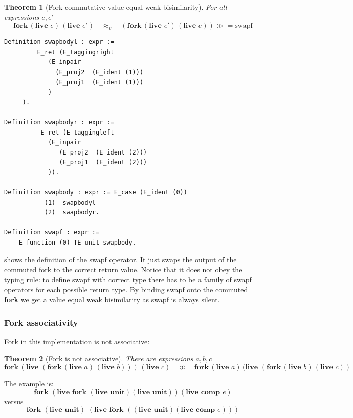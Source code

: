 \documentclass[12pt,twoside,notitlepage]{report}
\theoremstyle{plain}%
\newtheorem{thm}{Theorem}[section]
\theoremstyle{definition}
\theoremstyle{remark}
\begin{document}
\begin{thm}[Fork commutative value equal weak bisimilarity]
For all expressions $ e, e'$
\[  \textbf{fork}\,(\textbf{live }e)\,(\textbf{live }e')\quad \approx_v \quad (\textbf{fork}\,(\textbf{live }e')\,(\textbf{live }e))\gg=\text{swapf} \]
\end{thm}

\begin{lstlisting}[language={Coq}, caption={Swapf operator}, label={lst:swapf_op}]
Definition swapbodyl : expr :=
         E_ret (E_taggingright
            (E_inpair 
              (E_proj2  (E_ident (1))) 
              (E_proj1  (E_ident (1)))  
            )
     ).

Definition swapbodyr : expr :=
          E_ret (E_taggingleft  
            (E_inpair 
               (E_proj2  (E_ident (2))) 
               (E_proj1  (E_ident (2)))  
            )).

Definition swapbody : expr := E_case (E_ident (0)) 
           (1)  swapbodyl
           (2)  swapbodyr.

Definition swapf : expr :=
    E_function (0) TE_unit swapbody.
\end{lstlisting}
 shows the definition of the swapf operator. It just swaps the output of the commuted fork to the correct return value. Notice that it does not obey the typing rule: to define swapf with correct type there has to be a family of swapf operators for each possible return type. By binding swapf onto the commuted \textbf{fork} we get a value equal weak bisimilarity as swapf is always silent.

\subsubsection{Fork associativity}
Fork in this implementation is not associative:

\begin{thm}[Fork is not associative]
There are expressions $a, b, c$
\[  \textbf{fork}\,(\textbf{live }(\textbf{fork}\,(\textbf{live }a)\,(\textbf{live }b)))\,(\textbf{live }c)\quad \not\approx \quad \textbf{fork}\,(\textbf{live }a)\,(\textbf{live }(\textbf{fork}\,(\textbf{live }b)\,(\textbf{live }c)) \]
\end{thm}

The example is:
\[ \textbf{fork } (\textbf{live }\textbf{fork }(\textbf{live }\textbf{unit})  (\textbf{live }\textbf{unit}))  (\textbf{live }\textbf{comp } e) \tag{R-Assoc} \label{eq:fork_assoc_counter_r} \]
versus
\[ \textbf{fork } (\textbf{live }\textbf{unit})\,\,(\textbf{live }  \textbf{fork } ((\textbf{live }\textbf{unit})  (\textbf{live }\textbf{comp } e))) \tag{L-Assoc} \label{eq:fork_assoc_counter_l} \]
\end{document}
